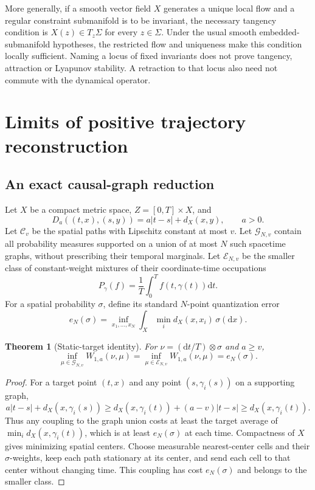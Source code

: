 \documentclass[aip,adv,reprint,onecolumn,amsmath,amssymb]{revtex4-2}
\newcommand{\dd}{\mathrm d}
\newtheorem{theorem}{Theorem}[section]
\begin{document}
More generally, if a smooth vector field $X$ generates a unique local flow and a regular constraint submanifold is to be invariant, the necessary tangency condition is $X(z)\in T_z\Sigma$ for every $z\in\Sigma$. Under the usual smooth embedded-submanifold hypotheses, the restricted flow and uniqueness make this condition locally sufficient. Naming a locus of fixed invariants does not prove tangency, attraction or Lyapunov stability. A retraction to that locus also need not commute with the dynamical operator.

\section{Limits of positive trajectory reconstruction}
\label{app:reconstruction}
\subsection{An exact causal-graph reduction}
Let $X$ be a compact metric space, $Z=[0,T]\times X$, and
\begin{equation}
 D_a((t,x),(s,y))=a|t-s|+d_X(x,y),\qquad a>0.
\end{equation}
Let $\mathcal C_v$ be the spatial paths with Lipschitz constant at most $v$. Let $\mathcal G_{N,v}$ contain all probability measures supported on a union of at most $N$ such spacetime graphs, without prescribing their temporal marginals. Let $\mathcal E_{N,v}$ be the smaller class of constant-weight mixtures of their coordinate-time occupations
\begin{equation}
 P_\gamma(f)=\frac1T\int_0^T f(t,\gamma(t))\dd t.
\end{equation}
For a spatial probability $\sigma$, define its standard $N$-point quantization error\cite{kloeckner}
\begin{equation}
 e_N(\sigma)=\inf_{x_1,\ldots,x_N}\int_X\min_i d_X(x,x_i)\,\sigma(\dd x).
\end{equation}
\begin{theorem}[Static-target identity]
For $\nu=(\dd t/T)\otimes\sigma$ and $a\ge v$,
\begin{equation}
 \inf_{\mu\in\mathcal G_{N,v}}W_{1,a}(\nu,\mu)
 =\inf_{\mu\in\mathcal E_{N,v}}W_{1,a}(\nu,\mu)=e_N(\sigma).
 \label{eq:quantization}
\end{equation}
\end{theorem}
\begin{proof}
For a target point $(t,x)$ and any point $(s,\gamma_i(s))$ on a supporting graph,
\begin{equation}
 a|t-s|+d_X(x,\gamma_i(s))\ge d_X(x,\gamma_i(t))+(a-v)|t-s|\ge d_X(x,\gamma_i(t)).
\end{equation}
Thus any coupling to the graph union costs at least the target average of $\min_i d_X(x,\gamma_i(t))$, which is at least $e_N(\sigma)$ at each time. Compactness of $X$ gives minimizing spatial centers. Choose measurable nearest-center cells and their $\sigma$-weights, keep each path stationary at its center, and send each cell to that center without changing time. This coupling has cost $e_N(\sigma)$ and belongs to the smaller class.
\end{proof}
\end{document}
